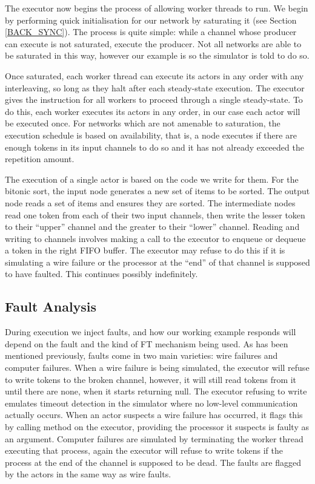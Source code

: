 The executor now begins the process of allowing worker threads to run.
We begin by performing quick initialisation for our network by saturating it (see Section \ref{BACK_SYNC}).
The process is quite simple: while a channel whose producer can execute is not saturated, execute the producer.
Not all networks are able to be saturated in this way, however our example is so the simulator is told to do so.

Once saturated, each worker thread can execute its actors in any order with any interleaving, so long as they halt after each steady-state execution.
The executor gives the instruction for all workers to proceed through a single steady-state.
To do this, each worker executes its actors in any order, in our case each actor will be executed once.
For networks which are not amenable to saturation, the execution schedule is based on availability, that is, a node executes if there are enough tokens in its input channels to do so and it has not already exceeded the repetition amount.

The execution of a single actor is based on the code we write for them.
For the bitonic sort, the input node generates a new set of items to be sorted.
The output node reads a set of items and ensures they are sorted.
The intermediate nodes read one token from each of their two input channels, then write the lesser token to their ``upper'' channel and the greater to their ``lower'' channel.
Reading and writing to channels involves making a call to the executor to enqueue or dequeue a token in the right FIFO buffer.
The executor may refuse to do this if it is simulating a wire failure or the processor at the ``end'' of that channel is supposed to have faulted.
This continues possibly indefinitely.

\subsection{Fault Analysis}

During execution we inject faults, and how our working example responds will depend on the fault and the kind of FT mechanism being used.
As has been mentioned previously, faults come in two main varieties: wire failures and computer failures.
When a wire failure is being simulated, the executor will refuse to write tokens to the broken channel, however, it will still read tokens from it until there are none, when it starts returning null.
The executor refusing to write emulates timeout detection in the simulator where no low-level communication actually occurs.
When an actor suspects a wire failure has occurred, it flags this by calling method on the executor, providing the processor it suspects is faulty as an argument.
Computer failures are simulated by terminating the worker thread executing that process, again the executor will refuse to write tokens if the process at the end of the channel is supposed to be dead.
The faults are flagged by the actors in the same way as wire faults.


